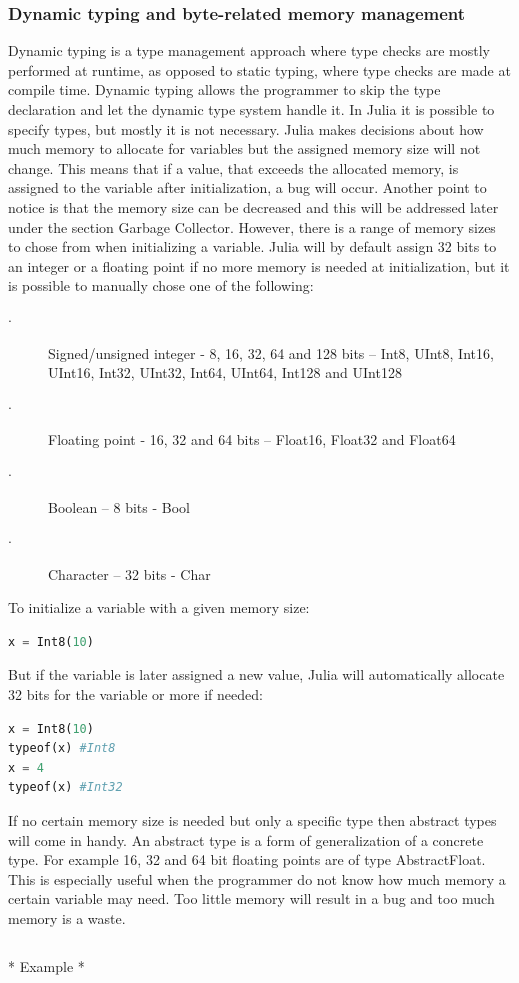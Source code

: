 \documentclass[a4paper, 11pt, titlepage]{article}
\begin{document}
\subsubsection{Dynamic typing and byte-related memory management}
Dynamic typing is a type management approach where type checks are mostly performed at runtime, as opposed to static typing, where type checks are made at compile time. Dynamic typing allows the programmer to skip the type declaration and let the dynamic type system handle it. In Julia it is possible to specify types, but mostly it is not necessary. 
Julia makes decisions about how much memory to allocate for variables but the assigned memory size will not change. This means that if a value, that exceeds the allocated memory, is assigned to the variable after initialization, a bug will occur. Another point to notice is that the memory size can be decreased and this will be addressed later under the section Garbage Collector. However, there is a range of memory sizes to chose from when initializing a variable. Julia will by default assign 32 bits to an integer or a floating point if no more memory is needed at initialization, but it is possible to manually chose one of the following:
\begin{description}
	\item[$\cdot$] Signed/unsigned integer - 8, 16, 32, 64 and 128 bits – Int8, UInt8, Int16, UInt16, Int32, UInt32, Int64, UInt64, Int128 and UInt128
	\item[$\cdot$] Floating point - 16, 32 and 64 bits – Float16, Float32 and Float64
	\item[$\cdot$] Boolean – 8 bits - Bool
	\item[$\cdot$] Character – 32 bits - Char
\end{description}
To initialize a variable with a given memory size:
\begin{lstlisting}[language=python]
x = Int8(10)
\end{lstlisting}
But if the variable is later assigned a new value, Julia will automatically allocate 32 bits for the variable or more if needed:
\begin{lstlisting}[language=python]
x = Int8(10)
typeof(x) #Int8
x = 4
typeof(x) #Int32
\end{lstlisting}
If no certain memory size is needed but only a specific type then abstract types will come in handy. An abstract type is a form of generalization of a concrete type. For example 16, 32 and 64 bit floating points are of type AbstractFloat. This is especially useful when the programmer do not know how much memory a certain variable may need. Too little memory will result in a bug and too much memory is a waste. 
\begin{lstlisting}
\end{lstlisting}
* Example *
\end{document}
